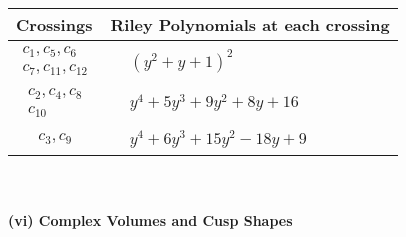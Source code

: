 \documentclass[1p]{elsarticle_modified}
\theoremstyle{definition}
\begin{document}
\begin{tabular}{m{50pt}|m{274pt}}
Crossings & \hspace{64pt}Riley Polynomials at each crossing \\
\hline $$\begin{aligned}c_{1},c_{5},c_{6}\\c_{7},c_{11},c_{12}\end{aligned}$$&$\begin{aligned}
&(y^2+y+1)^2
\end{aligned}$\\
\hline $$\begin{aligned}c_{2},c_{4},c_{8}\\c_{10}\end{aligned}$$&$\begin{aligned}
&y^4+5 y^3+9 y^2+8 y+16
\end{aligned}$\\
\hline $$\begin{aligned}c_{3},c_{9}\end{aligned}$$&$\begin{aligned}
&y^4+6 y^3+15 y^2-18 y+9
\end{aligned}$\\
\hline
\end{tabular}\\~\\
\newpage\flushleft \textbf{(vi) Complex Volumes and Cusp Shapes}
\end{document}
